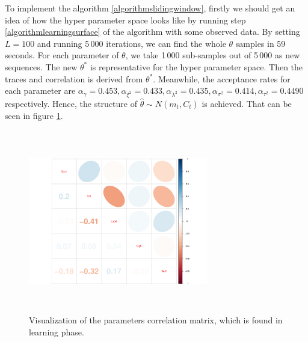 To implement the algorithm \ref{algorithmslidingwindow}, firstly we should get an idea of how the hyper parameter space looks like by running step \ref{algorithmlearningsurface} of the algorithm with some observed data. By setting $L=100$ and running 5\,000 iterations, we can find the whole $\theta$ samples in 59 seconds. For each parameter of $\theta$, we take 1\,000 sub-samples out of 5\,000 as new sequences. The new $\theta^*$ is representative for the hyper parameter space. Then the traces and correlation is derived from $\theta^*$. Meanwhile, the acceptance rates for each parameter are $\alpha_\gamma = 0.453,\alpha_{\xi^2}=0.433, \alpha_{\lambda^2}=0.435, \alpha_{\sigma^2}=0.414, \alpha_{\tau^2}=0.4490$ respectively. Hence, the structure of  $\hat{\theta}\sim N\left( m_t,C_t\right)$ is achieved. That can be seen in figure \ref{realdatacorMatrix}. 
\begin{figure}[h]
\centering
\includegraphics[width=0.7\textwidth,height=8cm]{Chapters/05MCMCOU/plots/realdatalearningcorMatrix.pdf}
\caption{Visualization of the parameters correlation matrix, which is found in learning phase. }\label{realdatacorMatrix}
\end{figure}


